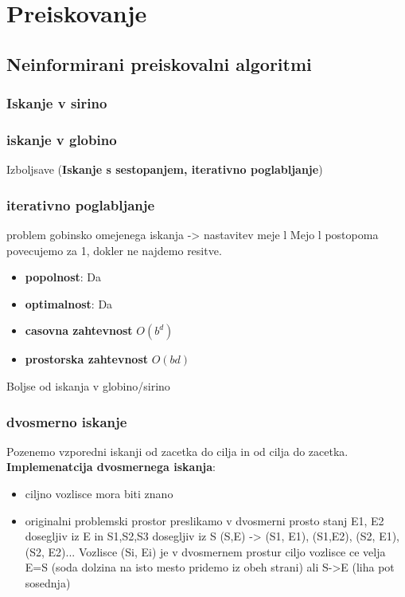 \section{Preiskovanje}

\subsection{Neinformirani preiskovalni algoritmi}

\subsubsection{Iskanje v sirino}

\subsubsection{iskanje v globino}
Izboljsave (\textbf{Iskanje s sestopanjem, iterativno poglabljanje})

\subsubsection{iterativno poglabljanje}
problem gobinsko omejenega iskanja -> nastavitev meje l
Mejo l postopoma povecujemo za 1, dokler ne najdemo resitve.
\begin{itemize}[noitemsep,topsep=0pt]
    \item \textbf{popolnost}: Da
    \item \textbf{optimalnost}: Da
    \item \textbf{casovna zahtevnost} $O(b^d)$
    \item \textbf{prostorska zahtevnost} $O(bd)$
\end{itemize}
Boljse od iskanja v globino/sirino
\subsubsection{dvosmerno iskanje}
Pozenemo vzporedni iskanji od zacetka do cilja in od cilja do zacetka.\\
\textbf{Implemenatcija dvosmernega iskanja}:
\begin{itemize}[noitemsep,topsep=0pt,leftmargin=*]
    \item ciljno vozlisce mora biti znano
    \item originalni problemski prostor preslikamo v dvosmerni prosto stanj
    E1, E2 dosegljiv iz E in S1,S2,S3 dosegljiv iz S
    (S,E) -> {(S1, E1), (S1,E2), (S2, E1), (S2, E2)...}
    Vozlisce (Si, Ei) je v dvosmernem prostur ciljo vozlisce ce velja E=S (soda dolzina na isto mesto pridemo iz obeh strani) ali S->E (liha pot sosednja)
\end{itemize}

